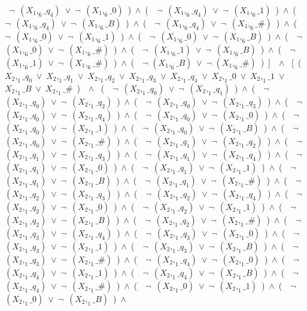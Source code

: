 ﻿\documentclass[a4paper,10pt]{article}
\begin{document}
\ $\neg$\ $(X_1,_6\_q_4)$\ $\vee$\ $\neg$\ $(X_1,_6\_0)$\ )\ $\wedge$\ (\ \ $\neg$\ $(X_1,_6\_q_4)$\ $\vee$\ $\neg$\ $(X_1,_6\_1)$\ )\ $\wedge$\ (\ \ $\neg$\ $(X_1,_6\_q_4)$\ $\vee$\ $\neg$\ $(X_1,_6\_B)$\ )\ $\wedge$\ (\ \ $\neg$\ $(X_1,_6\_q_4)$\ $\vee$\ $\neg$\ $(X_1,_6\_\#)$\ )\ $\wedge$\ (\ \ $\neg$\ $(X_1,_6\_0)$\ $\vee$\ $\neg$\ $(X_1,_6\_1)$\ )\ $\wedge$\ (\ \ $\neg$\ $(X_1,_6\_0)$\ $\vee$\ $\neg$\ $(X_1,_6\_B)$\ )\ $\wedge$\ (\ \ $\neg$\ $(X_1,_6\_0)$\ $\vee$\ $\neg$\ $(X_1,_6\_\#)$\ )\ $\wedge$\ (\ \ $\neg$\ $(X_1,_6\_1)$\ $\vee$\ $\neg$\ $(X_1,_6\_B)$\ )\ $\wedge$\ (\ \ $\neg$\ $(X_1,_6\_1)$\ $\vee$\ $\neg$\ $(X_1,_6\_\#)$\ )\ $\wedge$\ (\ \ $\neg$ $(X_1,_6\_B)$\ $\vee$\ $\neg$ $(X_1,_6\_\#)$\ )\ ]\ \ $\wedge$ \ [\ (\ $X_2,_1\_q_0$\ $\vee$\ $X_2,_1\_q_1$\ $\vee$\ $X_2,_1\_q_2$\ $\vee$\ $X_2,_1\_q_3$\ $\vee$\ $X_2,_1\_q_4$\ $\vee$\ $X_2,_1\_0$\ $\vee$\ $X_2,_1\_1$\ $\vee$\ $X_2,_1\_B$\ $\vee$\ $X_2,_1\_\#$\ )\ \ $\wedge$ \ (\ \ $\neg$\ $(X_2,_1\_q_0)$\ $\vee$\ $\neg$\ $(X_2,_1\_q_1)$\ )\ $\wedge$\ (\ \ $\neg$\ $(X_2,_1\_q_0)$\ $\vee$\ $\neg$\ $(X_2,_1\_q_2)$\ )\ $\wedge$\ (\ \ $\neg$\ $(X_2,_1\_q_0)$\ $\vee$\ $\neg$\ $(X_2,_1\_q_3)$\ )\ $\wedge$\ (\ \ $\neg$\ $(X_2,_1\_q_0)$\ $\vee$\ $\neg$\ $(X_2,_1\_q_4)$\ )\ $\wedge$\ (\ \ $\neg$\ $(X_2,_1\_q_0)$\ $\vee$\ $\neg$\ $(X_2,_1\_0)$\ )\ $\wedge$\ (\ \ $\neg$\ $(X_2,_1\_q_0)$\ $\vee$\ $\neg$\ $(X_2,_1\_1)$\ )\ $\wedge$\ (\ \ $\neg$\ $(X_2,_1\_q_0)$\ $\vee$\ $\neg$\ $(X_2,_1\_B)$\ )\ $\wedge$\ (\ \ $\neg$\ $(X_2,_1\_q_0)$\ $\vee$\ $\neg$\ $(X_2,_1\_\#)$\ )\ $\wedge$\ (\ \ $\neg$\ $(X_2,_1\_q_1)$\ $\vee$\ $\neg$\ $(X_2,_1\_q_2)$\ )\ $\wedge$\ (\ \ $\neg$\ $(X_2,_1\_q_1)$\ $\vee$\ $\neg$\ $(X_2,_1\_q_3)$\ )\ $\wedge$\ (\ \ $\neg$\ $(X_2,_1\_q_1)$\ $\vee$\ $\neg$\ $(X_2,_1\_q_4)$\ )\ $\wedge$\ (\ \ $\neg$\ $(X_2,_1\_q_1)$\ $\vee$\ $\neg$\ $(X_2,_1\_0)$\ )\ $\wedge$\ (\ \ $\neg$\ $(X_2,_1\_q_1)$\ $\vee$\ $\neg$\ $(X_2,_1\_1)$\ )\ $\wedge$\ (\ \ $\neg$\ $(X_2,_1\_q_1)$\ $\vee$\ $\neg$\ $(X_2,_1\_B)$\ )\ $\wedge$\ (\ \ $\neg$\ $(X_2,_1\_q_1)$\ $\vee$\ $\neg$\ $(X_2,_1\_\#)$\ )\ $\wedge$\ (\ \ $\neg$\ $(X_2,_1\_q_2)$\ $\vee$\ $\neg$\ $(X_2,_1\_q_3)$\ )\ $\wedge$\ (\ \ $\neg$\ $(X_2,_1\_q_2)$\ $\vee$\ $\neg$\ $(X_2,_1\_q_4)$\ )\ $\wedge$\ (\ \ $\neg$\ $(X_2,_1\_q_2)$\ $\vee$\ $\neg$\ $(X_2,_1\_0)$\ )\ $\wedge$\ (\ \ $\neg$\ $(X_2,_1\_q_2)$\ $\vee$\ $\neg$\ $(X_2,_1\_1)$\ )\ $\wedge$\ (\ \ $\neg$\ $(X_2,_1\_q_2)$\ $\vee$\ $\neg$\ $(X_2,_1\_B)$\ )\ $\wedge$\ (\ \ $\neg$\ $(X_2,_1\_q_2)$\ $\vee$\ $\neg$\ $(X_2,_1\_\#)$\ )\ $\wedge$\ (\ \ $\neg$\ $(X_2,_1\_q_3)$\ $\vee$\ $\neg$\ $(X_2,_1\_q_4)$\ )\ $\wedge$\ (\ \ $\neg$\ $(X_2,_1\_q_3)$\ $\vee$\ $\neg$\ $(X_2,_1\_0)$\ )\ $\wedge$\ (\ \ $\neg$\ $(X_2,_1\_q_3)$\ $\vee$\ $\neg$\ $(X_2,_1\_1)$\ )\ $\wedge$\ (\ \ $\neg$\ $(X_2,_1\_q_3)$\ $\vee$\ $\neg$\ $(X_2,_1\_B)$\ )\ $\wedge$\ (\ \ $\neg$\ $(X_2,_1\_q_3)$\ $\vee$\ $\neg$\ $(X_2,_1\_\#)$\ )\ $\wedge$\ (\ \ $\neg$\ $(X_2,_1\_q_4)$\ $\vee$\ $\neg$\ $(X_2,_1\_0)$\ )\ $\wedge$\ (\ \ $\neg$\ $(X_2,_1\_q_4)$\ $\vee$\ $\neg$\ $(X_2,_1\_1)$\ )\ $\wedge$\ (\ \ $\neg$\ $(X_2,_1\_q_4)$\ $\vee$\ $\neg$\ $(X_2,_1\_B)$\ )\ $\wedge$\ (\ \ $\neg$\ $(X_2,_1\_q_4)$\ $\vee$\ $\neg$\ $(X_2,_1\_\#)$\ )\ $\wedge$\ (\ \ $\neg$\ $(X_2,_1\_0)$\ $\vee$\ $\neg$\ $(X_2,_1\_1)$\ )\ $\wedge$\ (\ \ $\neg$\ $(X_2,_1\_0)$\ $\vee$\ $\neg$\ $(X_2,_1\_B)$\ )\ $\wedge$\ 
\end{document}
